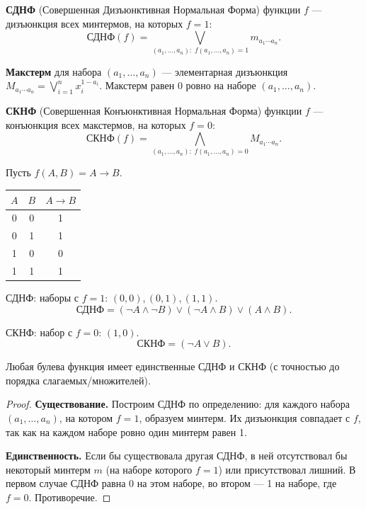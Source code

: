 \documentclass[12pt]{article}
\begin{document}
\begin{definition}
\textbf{СДНФ} (Совершенная Дизъюнктивная Нормальная Форма) функции $f$ ---
дизъюнкция всех минтермов, на которых $f = 1$:
\[
\text{СДНФ}(f) = \bigvee_{(a_1,\ldots,a_n):\; f(a_1,\ldots,a_n)=1}
m_{a_1\cdots a_n}.
\]
\end{definition}

\begin{definition}
\textbf{Макстерм} для набора $(a_1,\ldots,a_n)$ ---
элементарная дизъюнкция $\displaystyle M_{a_1\cdots a_n} =
\bigvee_{i=1}^n x_i^{1-a_i}$.
Макстерм равен 0 ровно на наборе $(a_1,\ldots,a_n)$.
\end{definition}

\begin{definition}
\textbf{СКНФ} (Совершенная Конъюнктивная Нормальная Форма) функции $f$ ---
конъюнкция всех макстермов, на которых $f = 0$:
\[
\mathrm{СКНФ}(f) = \bigwedge_{(a_1,\ldots,a_n):\; f(a_1,\ldots,a_n)=0}
M_{a_1\cdots a_n}.
\]
\end{definition}

\begin{example}
Пусть $f(A,B) = A \to B$.

\begin{center}
\begin{tabular}{|c|c|c|}
\hline
$A$ & $B$ & $A \to B$ \\ \hline
0 & 0 & 1 \\
0 & 1 & 1 \\
1 & 0 & 0 \\
1 & 1 & 1 \\ \hline
\end{tabular}
\end{center}

СДНФ: наборы с $f=1$: $(0,0),(0,1),(1,1)$.
\[
\text{СДНФ} = (\neg A \wedge \neg B) \vee (\neg A \wedge B)
\vee (A \wedge B).
\]

СКНФ: набор с $f=0$: $(1,0)$.
\[
\mathrm{СКНФ} = (\neg A \vee B).
\]
\end{example}

\begin{theorem}
Любая булева функция имеет единственные СДНФ и СКНФ (с точностью
до порядка слагаемых/множителей).
\end{theorem}
\begin{proof}
\textbf{Существование.} Построим СДНФ по определению:
для каждого набора $(a_1,\ldots,a_n)$, на котором $f=1$, образуем
минтерм. Их дизъюнкция совпадает с $f$, так как на каждом
наборе ровно один минтерм равен 1.

\textbf{Единственность.} Если бы существовала другая СДНФ,
в ней отсутствовал бы некоторый минтерм $m$ (на наборе которого $f=1$)
или присутствовал лишний. В первом случае СДНФ равна 0 на этом наборе,
во втором --- 1 на наборе, где $f=0$. Противоречие.
\end{proof}
\end{document}
